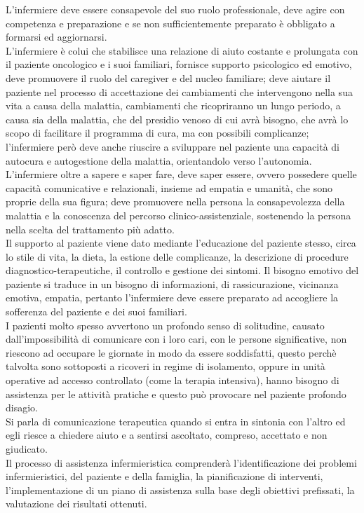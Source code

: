 L’infermiere deve essere consapevole del suo ruolo professionale, deve agire con competenza e preparazione e se non 
sufficientemente preparato è obbligato a formarsi ed aggiornarsi.\\ 
L’infermiere è colui che stabilisce una relazione di aiuto costante e prolungata con il paziente oncologico e i suoi 
familiari, fornisce supporto psicologico ed emotivo, deve promuovere il ruolo del caregiver e del nucleo familiare; 
deve aiutare il paziente nel processo di accettazione dei cambiamenti che intervengono nella sua vita a causa della 
malattia, cambiamenti che ricopriranno un lungo periodo, a causa sia della malattia, che del presidio venoso di cui 
avrà bisogno, che avrà lo scopo di facilitare il programma di cura, ma con possibili complicanze; l’infermiere però 
deve anche riuscire a sviluppare nel paziente una capacità di autocura e autogestione della malattia, orientandolo 
verso l’autonomia.\\
L’infermiere oltre a sapere e saper fare, deve saper essere, ovvero possedere quelle capacità comunicative e 
relazionali, insieme ad empatia e umanità, che sono proprie della sua figura; deve promuovere nella persona la 
consapevolezza della malattia e la conoscenza del percorso clinico-assistenziale, sostenendo la persona nella 
scelta del trattamento più adatto\cite{COMUNICAZIONE}.\\
Il supporto al paziente viene dato mediante l’educazione del paziente stesso, circa lo stile di vita, la dieta, la 
estione delle complicanze, la descrizione di procedure diagnostico-terapeutiche, il controllo e gestione dei sintomi. 
Il bisogno emotivo del paziente si traduce in un bisogno di informazioni, di rassicurazione, vicinanza emotiva, 
empatia, pertanto l’infermiere deve essere preparato ad accogliere la sofferenza del paziente e dei suoi familiari.\\
I pazienti molto spesso avvertono un profondo senso di solitudine, causato dall’impossibilità di comunicare con i 
loro cari, con le persone significative, non riescono ad occupare le giornate in modo da essere soddisfatti, questo 
perchè talvolta sono sottoposti a ricoveri in regime di isolamento, oppure in unità operative ad accesso controllato 
(come la terapia intensiva), hanno bisogno di assistenza per le attività pratiche e questo può provocare 
nel paziente profondo disagio.\\
Si parla di comunicazione terapeutica quando si entra in sintonia con l’altro ed egli riesce a chiedere aiuto e a 
sentirsi ascoltato, compreso, accettato e non giudicato\cite{NURSE24}.\\
Il processo di assistenza infermieristica comprenderà l'identificazione dei problemi infermieristici, del paziente e 
della famiglia, la pianificazione di interventi, l’implementazione di un piano di assistenza sulla base degli 
obiettivi prefissati, la valutazione dei risultati ottenuti.\\
